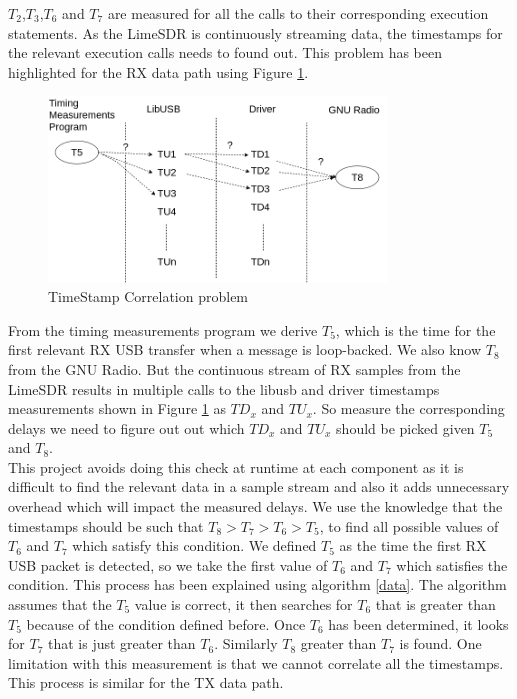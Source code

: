 $T_2$,$T_3$,$T_6$ and $T_7$ are measured for all the calls to their corresponding execution statements.
As the LimeSDR is continuously streaming data, the timestamps for the relevant execution calls needs to found out.
This problem has been highlighted for the RX data path using Figure \ref{corr_problem}.\\
\begin{figure}[h!]
\centering
\includegraphics[width=0.8\textwidth]{Thesis/Figure/events.png}
\caption{TimeStamp Correlation problem}
\label{corr_problem}
\end{figure}

From the timing measurements program we derive $T_5$, which is the time for the first relevant RX USB transfer when a message is loop-backed.
We also know $T_8$ from the GNU Radio.
But the continuous stream of RX samples from the LimeSDR results in multiple calls to the libusb and driver timestamps measurements shown in Figure \ref{corr_problem} as $TD_x$ and $TU_x$.
So measure the corresponding delays we need to figure out out which $TD_x$ and $TU_x$ should be picked given $T_5$ and $T_8$. \\


This project avoids doing this check at runtime at each component as it is difficult to find the relevant data in a sample stream and also it adds unnecessary overhead which will impact the measured delays.
We use the knowledge that the timestamps should be such that $T_8>T_7>T_6>T_5$, to find all possible values of $T_6$ and $T_7$ which satisfy this condition.
We defined $T_5$ as the time the first RX USB packet is detected, so we take the first value of $T_6$ and $T_7$ which satisfies the condition. This process has been explained using algorithm \ref{data}.
The algorithm assumes that the $T_5$ value is correct, it then searches for $T_6$ that is greater than $T_5$ because of the condition defined before.
Once $T_6$ has been determined, it looks for $T_7$ that is just greater than $T_6$.
Similarly $T_8$ greater than $T_7$ is found.
One limitation with this measurement is that we cannot correlate all the timestamps.
This process is similar for the TX data path.

